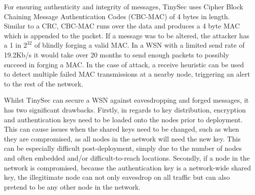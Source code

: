 For ensuring authenticity and integrity of messages, TinySec uses Cipher Block Chaining Message Authentication Codes (CBC-MAC) of 4 bytes in length. Similar to a CRC, CBC-MAC runs over the data and produces a 4 byte MAC which is appended to the packet. If a message was to be altered, the attacker has a 1 in $2^{32}$ of blindly forging a valid MAC. In a WSN with a limited send rate of 19.2Kb/s it would take over 20 months to send enough packets to possibly succeed in forging a MAC. In the case of attack, a receive heuristic can be used to detect multiple failed MAC transmissions at a nearby node, triggering an alert to the rest of the network.

Whilst TinySec can secure a WSN against eavesdropping and forged messages, it has two significant drawbacks. Firstly, in regards to key distribution, encryption and authentication keys need to be loaded onto the nodes prior to deployment. This can cause issues when the shared keys need to be changed, such as when they are compromised, as all nodes in the network will need the new key. This can be especially difficult post-deployment, simply due to the number of nodes and often embedded and/or difficult-to-reach locations. Secondly, if a node in the network is compromised, because the authentication key is a network-wide shared key, the illegitimate node can not only eavesdrop on all traffic but can also pretend to be any other node in the network.